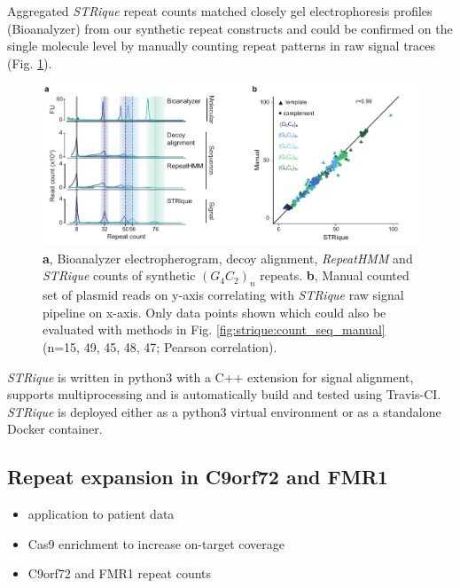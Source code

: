 Aggregated \textit{STRique} repeat counts matched closely gel electrophoresis profiles (Bioanalyzer) from our synthetic repeat constructs and could be confirmed on the single molecule level by manually counting repeat patterns in raw signal traces (Fig. \ref{fig:strique:count_signal_corr}).

\begin{figure}[h]
	\centering
	\includegraphics[width=1.0\textwidth]{figures/strique/count_signal_corr.pdf}
	\captionsetup{format=plain}
	\caption[Molecular, sequence and signal based STR evaluation]{\textbf{a}, Bioanalyzer electropherogram, decoy alignment, \textit{RepeatHMM} and \textit{STRique} counts of synthetic $ (G_{4}C_{2})_{n} $ repeats. \textbf{b}, Manual counted set of plasmid reads on y-axis correlating with \textit{STRique} raw signal pipeline on x-axis. Only data points shown which could also be evaluated with methods in Fig. \ref{fig:strique:count_seq_manual} (n=15, 49, 45, 48, 47; Pearson correlation).}
	\label{fig:strique:count_signal_corr}
\end{figure}

\textit{STRique} is written in python3 with a C++ extension for signal alignment, supports multiprocessing and is automatically build and tested using Travis-CI. \textit{STRique} is deployed either as a python3 virtual environment or as a standalone Docker container.




\subsection{Repeat expansion in C9orf72 and FMR1}
\label{subsec:strique:c9orf72}

\begin{itemize}
	\item application to patient data
	\item Cas9 enrichment to increase on-target coverage
	\item C9orf72 and FMR1 repeat counts
\end{itemize}


